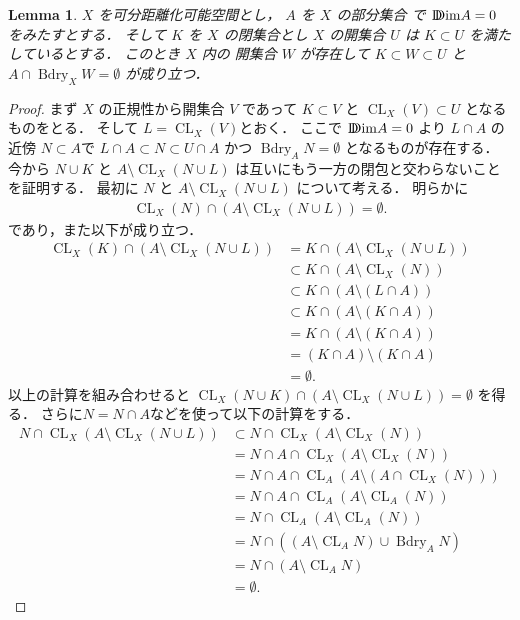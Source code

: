 \documentclass[leqno, a4paper, 12pt]{jsarticle}
\theoremstyle{plain}
\newtheorem{lem}[thm]{Lemma}
\theoremstyle{definition}
\theoremstyle{remark}
\DeclareMathOperator{\bd}{\mathrm{Bdry}}
\DeclareMathOperator{\cl}{\mathrm{CL}}
\newcommand{\yoddim}{\mathrm{D\hspace{-5.5pt}Dim}}
\numberwithin{equation}{section}
\begin{document}
\begin{lem}\label{lem:sum:jojo111}
$X$
を可分距離化可能空間とし，
$A$
を
$X$
の部分集合
で
$\yoddim A=0$
をみたすとする．
そして
$K$
を
$X$
の閉集合とし
$X$
の開集合
$U$
は
$K\subset U$
を満たしているとする．
このとき
$X$
内の
開集合
$W$
が存在して
$K\subset W\subset U$
と
$A\cap \bd_{X} W=\emptyset$
が成り立つ．
\end{lem}
\begin{proof}
まず
$X$
の正規性から開集合
$V$
であって
$K\subset V$
と
$\cl_{X}(V)\subset U$
となるものをとる．
そして
$L=\cl_{X}(V)$とおく．
ここで
$\yoddim A=0$
より
$L\cap A$
の
近傍
$N\subset A$で
$L\cap A\subset N\subset U\cap A$
かつ
$\bd_{A}N=\emptyset$
となるものが存在する．
今から
$N\cup K$
と
$A\setminus \cl_{X}(N\cup L)$
は互いにもう一方の閉包と交わらないことを証明する．
最初に
$N$
と
$A\setminus \cl_{X}(N\cup L)$
について考える．
明らかに
\begin{align}
\cl_{X}(N)\cap (A\setminus \cl_{X}(N\cup L))=\emptyset. 
\end{align}
であり，また以下が成り立つ．
\begin{align*}
\cl_{X}(K)\cap (A\setminus \cl_{X}(N\cup L))&=
K\cap (A\setminus \cl_{X}(N\cup L))\\
&\subset
K\cap (A\setminus \cl_{X}(N))
 \\
&\subset 
K\cap (A\setminus (L\cap A))\\
&\subset 
K\cap(A\setminus (K\cap A))\\
&=K\cap (A\setminus (K\cap A))\\
&=(K\cap A)\setminus (K\cap A)\\
&=\emptyset. 
\end{align*}
以上の計算を組み合わせると
$\cl_{X}(N\cup K)\cap (A\setminus \cl_{X}(N\cup L))=\emptyset$
を得る．
さらに$N=N\cap A$などを使って以下の計算をする．
\begin{align*}
N\cap 
\cl_{X}(A\setminus \cl_{X}(N\cup L))
&\subset N\cap 
\cl_{X}(A\setminus \cl_{X}(N))\\
&=
N \cap A\cap \cl_{X}(A\setminus \cl_{X}(N))
\\
&=
N\cap A\cap \cl_{A}(A\setminus (A\cap \cl_{X}(N)))
\\
&=
N\cap 
A\cap \cl_{A}(A\setminus \cl_{A}(N))\\
&=
N\cap 
\cl_{A}(A\setminus \cl_{A}(N))
\\
&=
N\cap (
(A\setminus \cl_{A} N)\cup \bd_{A} N)
\\
&=
N\cap (A\setminus \cl_{A} N)\\
&=\emptyset. 

\end{align*}
\end{proof}
\end{document}
